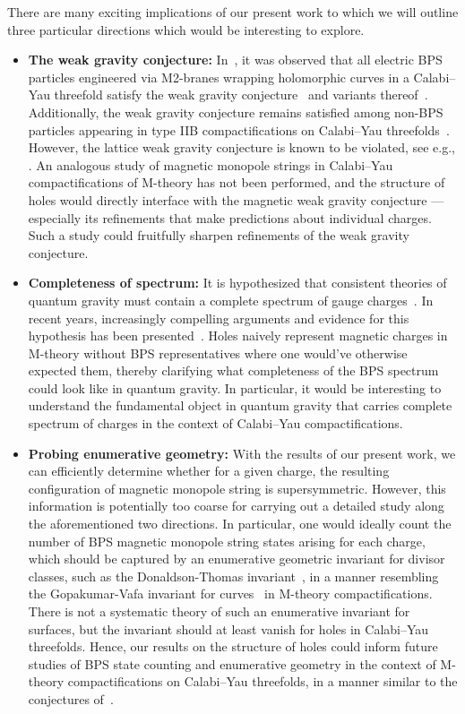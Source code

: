 \documentclass[11pt,dvipsnames]{article}
\theoremstyle{definition}
\begin{document}
There are many exciting implications of our present work to which we will outline three particular directions which would be interesting to explore.
\begin{itemize}
    \item \textbf{The weak gravity conjecture:} In~\cite{Gendler:2022ztv}, it was observed that all electric BPS particles engineered via M2-branes wrapping holomorphic curves in a Calabi--Yau threefold satisfy the weak gravity conjecture~\cite{Arkani-Hamed:2006emk} and variants thereof~\cite{Heidenreich:2015nta,Andriolo:2018lvp,Heidenreich:2016aqi}. Additionally, the weak gravity conjecture remains satisfied among non-BPS particles appearing in type IIB compactifications on Calabi--Yau threefolds~\cite{Gendler:2020dfp}. However, the lattice weak gravity conjecture is known to be violated, see e.g., \cite{Etheredge:2025rkn,Reece:2026hfk}. An analogous study of magnetic monopole strings in Calabi--Yau compactifications of M-theory has not been performed, and the structure of holes would directly interface with the magnetic weak gravity conjecture --- especially its refinements that make predictions about individual charges. 
    Such a study could fruitfully sharpen refinements of the weak gravity conjecture.
    \item \textbf{Completeness of spectrum:} It is hypothesized that consistent theories of quantum gravity must contain a complete spectrum of gauge charges~\cite{Polchinski:2003bq}. In recent years, increasingly compelling arguments and evidence for this hypothesis has been presented~\cite{Banks:2010zn,Harlow:2018tng,Rudelius:2020orz,Heidenreich:2021xpr,McNamara:2021cuo}. 
    Holes naively represent magnetic charges in M-theory without BPS representatives where one would've otherwise expected them, thereby clarifying what completeness of the BPS spectrum could look like in quantum gravity. In particular, it would be interesting to understand the fundamental object in quantum gravity that carries complete spectrum of charges in the context of Calabi--Yau compactifications.
    \item \textbf{Probing enumerative geometry:} With the results of our present work, we can efficiently determine whether for a given charge, the resulting configuration of magnetic monopole string is supersymmetric. However, this information is potentially too coarse for carrying out a detailed study along the aforementioned two directions. In particular, one would ideally count the number of BPS magnetic monopole string states arising for each charge, which should be captured by an enumerative geometric invariant for divisor classes, such as the Donaldson-Thomas invariant~\cite{maulik2006gromovi,maulik2006gromovii}, in a manner resembling the Gopakumar-Vafa invariant for curves~\cite{Gopakumar:1998jq} in M-theory compactifications. There is not a systematic theory of such an enumerative invariant for surfaces, but the invariant should at least vanish for holes in Calabi--Yau threefolds. Hence, our results on the structure of holes could inform future studies of BPS state counting and enumerative geometry in the context of M-theory compactifications on Calabi--Yau threefolds, in a manner similar to the conjectures of~\cite{Reece:2025zva}.
\end{itemize}
\end{document}
